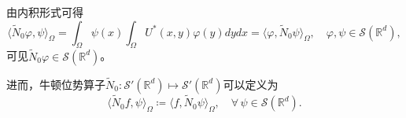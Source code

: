 由内积形式可得
\begin{equation*}
  \langle \widetilde{N}_{0} \varphi, \psi \rangle_{\Omega}
  = \int_{\Omega} \psi(x) \int_{\Omega} U^{*} (x,y) \varphi(y) dy dx
  = \langle \varphi, \widetilde{N}_{0}\psi \rangle_{\Omega}, \quad \varphi, \psi \in \mathcal{S}(\mathbb{R}^d),
\end{equation*}
可见$\widetilde{N}_{0} \varphi \in \mathcal{S}(\mathbb{R}^d)$。

进而，牛顿位势算子$\widetilde{N}_{0}: \mathcal{S}'(\mathbb{R}^d) \mapsto \mathcal{S}'(\mathbb{R}^d)$可以定义为
\begin{equation*}
  \langle \widetilde{N}_{0}f, \psi \rangle_{\Omega} \coloneqq
  \langle f, \widetilde{N}_{0} \psi \rangle_{\Omega}, \quad \forall \, \psi \in \mathcal{S}(\mathbb{R}^d).
\end{equation*}

